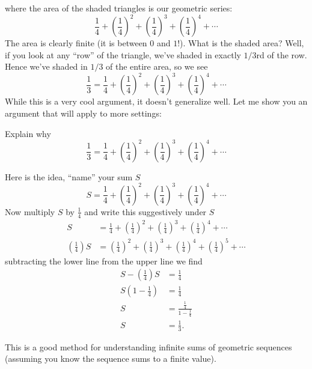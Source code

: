 \documentclass{ximera}
\begin{document}
where the area of the shaded triangles is our geometric series:
\[
\frac{1}{4} + \left(\frac{1}{4}\right)^2 + \left(\frac{1}{4}\right)^3 + \left(\frac{1}{4}\right)^4 + \cdots 
\]
The area is clearly finite (it is between $0$ and $1$!). What is the
shaded area? Well, if you look at any ``row'' of the triangle, we've
shaded in exactly $1/3$rd of the row. Hence we've shaded in $1/3$ of
the entire area, so we see
\[
\frac{1}{3}=\frac{1}{4} + \left(\frac{1}{4}\right)^2 + \left(\frac{1}{4}\right)^3 + \left(\frac{1}{4}\right)^4 + \cdots 
\]
While this is a very cool argument, it doesn't generalize well. Let me
show you an argument that will apply to more settings:

\begin{example}
  Explain why
  \[
  \frac{1}{3}=\frac{1}{4} + \left(\frac{1}{4}\right)^2 + \left(\frac{1}{4}\right)^3 + \left(\frac{1}{4}\right)^4 + \cdots 
  \]
  \begin{explanation}
    Here is the idea, ``name'' your sum $S$
    \[
    S = \frac{1}{4} + \left(\frac{1}{4}\right)^2 + \left(\frac{1}{4}\right)^3 + \left(\frac{1}{4}\right)^4 + \cdots 
    \]
    Now multiply $S$ by $\frac{1}{4}$ and write this suggestively under $S$
    \begin{align*}
      S &= \frac{1}{4} + \left(\frac{1}{4}\right)^2 + \left(\frac{1}{4}\right)^3 + \left(\frac{1}{4}\right)^4 + \cdots\\
     \left(\frac{1}{4}\right)S &=   \left(\frac{1}{4}\right)^2 + \left(\frac{1}{4}\right)^3 + \left(\frac{1}{4}\right)^4 + \left(\frac{1}{4}\right)^5+ \cdots
    \end{align*}
    subtracting the lower line from the upper line we find
    \begin{align*}
      S - \left(\frac{1}{4}\right)S &=  \frac{1}{4}\\
      S(1-\frac{1}{4}) &= \frac{1}{4}\\
      S &= \frac{\frac{1}{4}}{1-\frac{1}{4}}\\
      S &= \frac{1}{3}.
    \end{align*}
  \end{explanation}
\end{example}

This is a good method for understanding infinite sums of geometric
sequences (assuming you know the sequence sums to a finite value).
\end{document}

